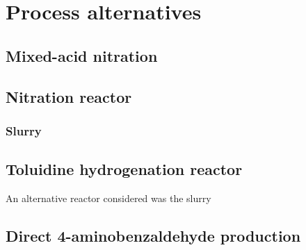 \section{Process alternatives}
\label{app:alternatives}

\subsection{Mixed-acid nitration}
\label{mixed}

\subsection{Nitration reactor}
\label{nitrationreactor}
\subsubsection{Slurry }

\subsection{Toluidine hydrogenation reactor}
\label{toluidine}
An alternative reactor considered was the slurry


\subsection{Direct 4-aminobenzaldehyde production}
\label{direct}